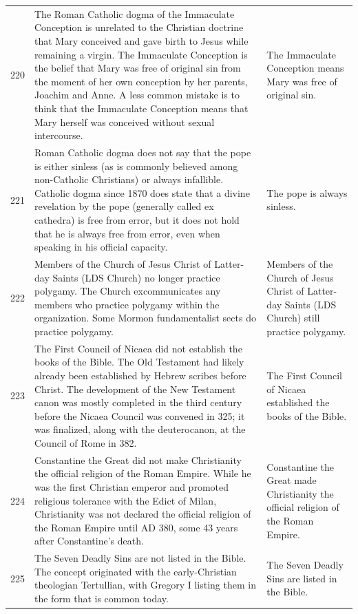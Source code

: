 \begin{tabular}{c|p{}|p{}}
220 & The Roman Catholic dogma of the Immaculate Conception is unrelated to the Christian doctrine that Mary conceived and gave birth to Jesus while remaining a virgin. The Immaculate Conception is the belief that Mary was free of original sin from the moment of her own conception by her parents, Joachim and Anne. A less common mistake is to think that the Immaculate Conception means that Mary herself was conceived without sexual intercourse. & The Immaculate Conception means Mary was free of original sin. \\
221 & Roman Catholic dogma does not say that the pope is either sinless (as is commonly believed among non-Catholic Christians) or always infallible. Catholic dogma since 1870 does state that a divine revelation by the pope (generally called ex cathedra) is free from error, but it does not hold that he is always free from error, even when speaking in his official capacity. & The pope is always sinless. \\
222 & Members of the Church of Jesus Christ of Latter-day Saints (LDS Church) no longer practice polygamy. The Church excommunicates any members who practice polygamy within the organization. Some Mormon fundamentalist sects do practice polygamy. & Members of the Church of Jesus Christ of Latter-day Saints (LDS Church) still practice polygamy. \\
223 & The First Council of Nicaea did not establish the books of the Bible. The Old Testament had likely already been established by Hebrew scribes before Christ. The development of the New Testament canon was mostly completed in the third century before the Nicaea Council was convened in 325; it was finalized, along with the deuterocanon, at the Council of Rome in 382. & The First Council of Nicaea established the books of the Bible. \\
224 & Constantine the Great did not make Christianity the official religion of the Roman Empire. While he was the first Christian emperor and promoted religious tolerance with the Edict of Milan, Christianity was not declared the official religion of the Roman Empire until AD 380, some 43 years after Constantine's death. & Constantine the Great made Christianity the official religion of the Roman Empire. \\
225 & The Seven Deadly Sins are not listed in the Bible. The concept originated with the early-Christian theologian Tertullian, with Gregory I listing them in the form that is common today. & The Seven Deadly Sins are listed in the Bible. \\

\end{tabular}

